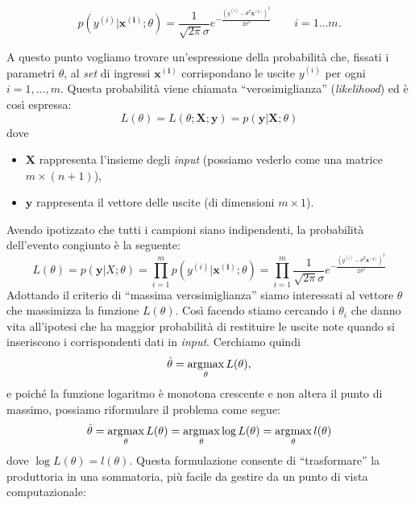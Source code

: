  \begin{equation*}
   p(y^{(i)}|\mathbf{x^{(i)}}; \theta) = \frac{1}{\sqrt{2 \pi} \sigma } e ^{-\frac{(y^{(i)}-\theta^T \mathbf{x^{(i)}})^2}{2 \sigma^2}} \qquad i=1 \dots m.\end{equation*}

A questo punto vogliamo trovare un'espressione della probabilità che, fissati i parametri $\theta$, al \emph{set} di ingressi $\mathbf{x^{(i)}}$ corrispondano le uscite $y^{(i)}$ per ogni $i=1,\dots,m$. Questa probabilità viene chiamata ``verosimiglianza'' (\emph{likelihood}) ed è così espressa:
\begin{equation*}
  L(\theta) = L(\theta;\mathbf{X};\mathbf{y})=p(\mathbf{y}|\mathbf{X};\theta) 
\end{equation*}
dove
\begin{itemize}
  \item $\mathbf{X}$ rappresenta l'insieme degli \emph{input} (possiamo vederlo come una matrice $m \times (n+1)$),
  \item $\mathbf{y}$ rappresenta il vettore delle uscite (di dimensioni $m \times 1$).
\end{itemize}
 Avendo ipotizzato che tutti i campioni siano indipendenti, la probabilità dell'evento congiunto è la seguente:
 \begin{equation*}
   L(\theta) =
    p(\mathbf{y}|X;\theta) 
    = \prod_{i=1}^m p(y^{(i)}|\mathbf{x^{(i)}};\theta)
    = \prod_{i=1}^m \frac{1}{\sqrt{2 \pi} \sigma } e ^{-\frac{(y^{(i)}-\theta^T \mathbf{x^{(i)}})^2}{2 \sigma^2}}
 \end{equation*}
Adottando il criterio di ``massima verosimiglianza'' siamo interessati al vettore $\theta$ che massimizza la funzione $L(\theta)$. Così facendo stiamo cercando i $\theta_i$ che danno vita all'ipotesi che ha maggior probabilità di restituire le uscite note quando si inseriscono i corrispondenti dati in \emph{input}.
Cerchiamo quindi
\begin{equation*}
  \hat\theta = \operatorname*{arg\!\max}_\theta L(\theta),
\end{equation*}
e poiché la funzione logaritmo è monotona crescente e non altera il punto di massimo, possiamo riformulare  il problema come segue:
\begin{equation*}
  \hat\theta = \operatorname*{arg\!\max}_\theta L(\theta) = \operatorname*{arg\!\max}_\theta \log  L(\theta) = \operatorname*{arg\!\max}_\theta l(\theta)
\end{equation*}
dove $\log L(\theta)=l(\theta)$.
Questa formulazione consente di ``trasformare'' la produttoria in una sommatoria, più facile da gestire da un punto di vista computazionale:
